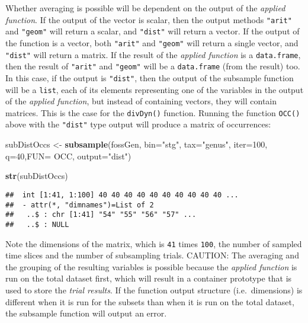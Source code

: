 \documentclass[]{article}
\newenvironment{Shaded}{\begin{snugshade}}{\end{snugshade}}
\newcommand{\KeywordTok}[1]{\textcolor[rgb]{0.13,0.29,0.53}{\textbf{{#1}}}}
\newcommand{\DataTypeTok}[1]{\textcolor[rgb]{0.13,0.29,0.53}{{#1}}}
\newcommand{\DecValTok}[1]{\textcolor[rgb]{0.00,0.00,0.81}{{#1}}}
\newcommand{\StringTok}[1]{\textcolor[rgb]{0.31,0.60,0.02}{{#1}}}
\newcommand{\NormalTok}[1]{{#1}}
\begin{document}
Whether averaging is possible will be dependent on the output of the
\emph{applied function}. If the output of the vector is scalar, then the
output methods \texttt{"arit"} and \texttt{"geom"} will return a scalar,
and \texttt{"dist"} will return a vector. If the output of the function
is a vector, both \texttt{"arit"} and \texttt{"geom"} will return a
single vector, and \texttt{"dist"} will return a matrix. If the result
of the \emph{applied function} is a \texttt{data.frame}, then the result
of \texttt{"arit"} and \texttt{"geom"} will be a \texttt{data.frame}
(from the result) too. In this case, if the output is \texttt{"dist"},
then the output of the subsample function will be a \texttt{list}, each
of its elements representing one of the variables in the output of the
\emph{applied function}, but instead of containing vectors, they will
contain matrices. This is the case for the \texttt{divDyn()} function.
Running the function \texttt{OCC()} above with the \texttt{"dist"} type
output will produce a matrix of occurrences:

\begin{Shaded}
\begin{Highlighting}[]
\NormalTok{subDistOccs <-}\StringTok{ }\KeywordTok{subsample}\NormalTok{(fossGen, }\DataTypeTok{bin=}\StringTok{"stg"}\NormalTok{, }\DataTypeTok{tax=}\StringTok{"genus"}\NormalTok{, }
  \DataTypeTok{iter=}\DecValTok{100}\NormalTok{, }\DataTypeTok{q=}\DecValTok{40}\NormalTok{,}\DataTypeTok{FUN=} \NormalTok{OCC, }\DataTypeTok{output=}\StringTok{"dist"}\NormalTok{)}
\end{Highlighting}
\end{Shaded}

\begin{Shaded}
\begin{Highlighting}[]
\KeywordTok{str}\NormalTok{(subDistOccs)}
\end{Highlighting}
\end{Shaded}

\begin{verbatim}
##  int [1:41, 1:100] 40 40 40 40 40 40 40 40 40 40 ...
##  - attr(*, "dimnames")=List of 2
##   ..$ : chr [1:41] "54" "55" "56" "57" ...
##   ..$ : NULL
\end{verbatim}

Note the dimensions of the matrix, which is \texttt{41} times
\texttt{100}, the number of sampled time slices and the number of
subsampling trials. CAUTION: The averaging and the grouping of the
resulting variables is possible because the \emph{applied function} is
run on the total dataset first, which will result in a container
prototype that is used to store the \emph{trial results}. If the
function output structure (i.e.~dimensions) is different when it is run
for the subsets than when it is run on the total dataset, the subsample
function will output an error.
\end{document}
